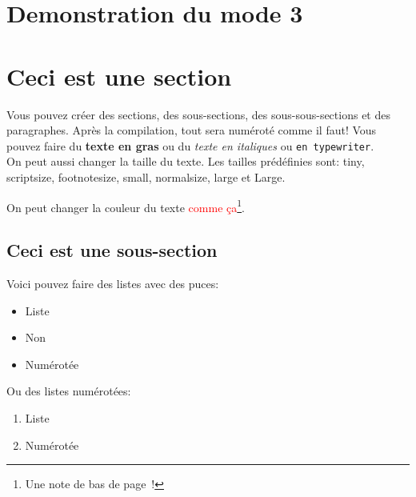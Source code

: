\documentclass[paper=a4, fontsize=11pt]{article}
\begin{document}
\section{Demonstration du mode 3}



















\section{Ceci est une section}
Vous pouvez créer des sections, des sous-sections, des sous-sous-sections et des paragraphes. Après
la compilation, tout sera numéroté comme il faut! Vous pouvez faire du \textbf{texte en gras} ou du
\textit{texte en italiques} ou \texttt{en typewriter}. \\

On peut aussi {\small changer} {\large la taille} {\tiny du texte}.  Les tailles prédéfinies sont:
{\tiny tiny}, {\scriptsize scriptsize}, {\footnotesize footnotesize}, {\small small}, {\normalsize
  normalsize}, {\large large} et {\Large Large}.

On peut changer la couleur du texte \textcolor{red}{comme
  ça}\footnote{Une note de bas de page~!}.

\subsection{Ceci est une sous-section}
Voici pouvez faire des listes avec des puces:

\begin{itemize}
\item Liste
\item Non
\item Numérotée
\end{itemize}

\vspace{0.5cm} %

Ou des listes numérotées:
\begin{enumerate}
\item Liste
\item Numérotée
\end{enumerate}
\end{document}
